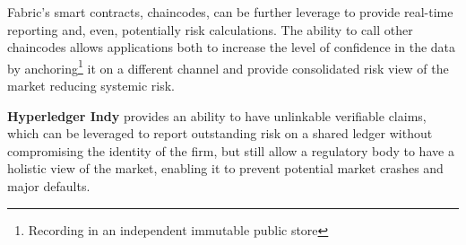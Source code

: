 Fabric's smart contracts, chaincodes, can be further leverage to provide real-time reporting and, even, potentially risk calculations. The ability to call other chaincodes allows applications both to increase the level of confidence in the data by anchoring\footnote{Recording in an independent immutable public store} it on a different channel and provide consolidated risk view of the market reducing systemic risk.

\textbf{Hyperledger Indy} provides an ability to have unlinkable verifiable claims, which can be leveraged to report outstanding risk on a shared ledger without compromising the identity of the firm, but still allow a regulatory body to have a holistic view of the market, enabling it to prevent potential market crashes and major defaults.
